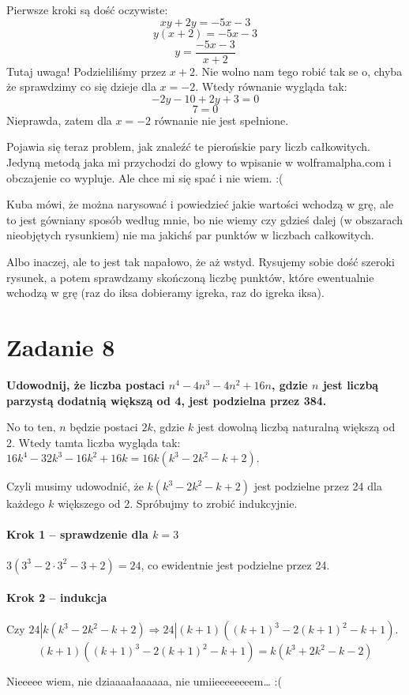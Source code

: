 \documentclass [a4paper, 10pt]{article}
\begin{document}
\rm Pierwsze kroki są dość oczywiste:
$$xy + 2y = -5x - 3$$
$$y(x+2) = -5x-3$$
$$y = \frac{-5x-3}{x+2}$$
Tutaj uwaga! Podzieliliśmy przez $x+2$. Nie wolno nam tego robić tak se o, chyba że sprawdzimy co się dzieje dla $x=-2$. Wtedy równanie wygląda tak:
$$-2y -10 +2y + 3 = 0$$
$$7 = 0$$
Nieprawda, zatem dla $x = -2$ równanie nie jest spełnione.

Pojawia się teraz problem, jak znaleźć te pierońskie pary liczb całkowitych. Jedyną metodą jaka mi przychodzi do głowy to wpisanie w wolframalpha.com i obczajenie co wypluje. Ale chce mi się spać i nie wiem. :(

Kuba mówi, że można narysować i powiedzieć jakie wartości wchodzą w grę, ale to jest gówniany sposób według mnie, bo nie wiemy czy gdzieś dalej (w obszarach nieobjętych rysunkiem) nie ma jakichś par punktów w liczbach całkowitych.

Albo inaczej, ale to jest tak napałowo, że aż wstyd. Rysujemy sobie dość szeroki rysunek, a potem sprawdzamy skończoną liczbę punktów, które ewentualnie wchodzą w grę (raz do iksa dobieramy igreka, raz do igreka iksa).

\section*{Zadanie 8}
\bf Udowodnij, że liczba postaci $n^4 - 4n^3 - 4n^2 + 16n$, gdzie $n$ jest liczbą parzystą dodatnią większą od 4, jest podzielna przez 384.

\rm No to ten, $n$ będzie postaci $2k$, gdzie $k$ jest dowolną liczbą naturalną większą od 2. Wtedy tamta liczba wygląda tak: $16k^4 - 32k^3 - 16k^2 + 16k = 16k(k^3 - 2k^2 - k + 2)$.

Czyli musimy udowodnić, że $k(k^3 - 2k^2 - k + 2)$ jest podzielne przez 24 dla każdego $k$ większego od 2. Spróbujmy to zrobić indukcyjnie.
\paragraph{Krok 1 -- sprawdzenie dla $k=3$}
$3(3^3 - 2\cdot3^2 - 3 + 2) = 24$, co ewidentnie jest podzielne przez 24.
\paragraph{Krok 2 -- indukcja}
Czy $24|k(k^3 - 2k^2 - k + 2) \Longrightarrow 24|(k+1)\left((k+1)^3-2(k+1)^2 - k + 1\right)$.
$$(k+1)\left((k+1)^3-2(k+1)^2 - k + 1 \right) = k(k^3 + 2k^2 - k - 2)$$

Nieeeee wiem, nie dziaaaałaaaaaa, nie umiieeeeeeeem… :(
\end{document}
